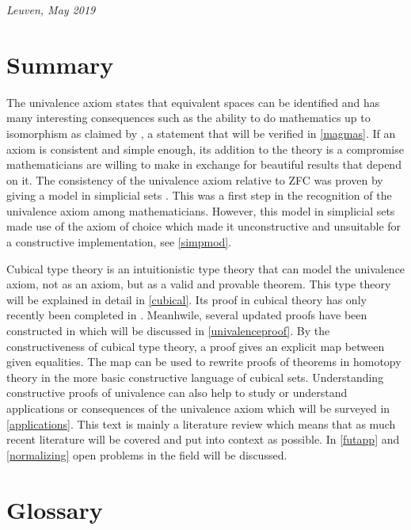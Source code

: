 \documentclass[12pt,a4paper,twoside,xetex]{book} %
\begin{document}
\mbox{}\hfill \textit{Leuven, May 2019}

\chapter*{Summary}


The univalence axiom states that equivalent spaces can be identified and has many interesting consequences such as the ability to do mathematics up to isomorphism as claimed by \cite{Voevodsky2013}, a statement that will be verified in \cref{magmas}. If an axiom is consistent and simple enough, its addition to the theory is a compromise mathematicians are willing to make in exchange for beautiful results that depend on it. The  consistency of the univalence axiom relative to ZFC was proven by giving a model in simplicial sets \cite{Kapulkin2012}. This was a first step in the recognition of the univalence axiom among mathematicians. However, this model in simplicial sets made use of the axiom of choice which made it unconstructive and unsuitable for a constructive implementation, see \cref{simpmod}.

Cubical type theory is an intuitionistic type theory that can model the univalence axiom, not as an axiom, but as a valid and provable theorem. This type theory will be explained in detail in \cref{cubical}. Its proof in cubical theory has only recently been completed in \cite{Cohen2016}. Meanhwile, several updated proofs have been constructed in \cite{Sterling2018b, Moertberg2018} which will be discussed in \cref{univalenceproof}. By the constructiveness of cubical type theory, a proof gives an explicit map between given equalities. The map can be used to rewrite proofs of theorems in homotopy theory in the more basic constructive language of cubical sets. Understanding constructive proofs of univalence can also help to study or understand applications or consequences of the univalence axiom which will be surveyed in \cref{applications}. This text is mainly a literature review which means that as much recent literature will be covered and put into context as possible. In \cref{futapp} and \cref{normalizing} open problems in the field will be discussed.

\chapter*{Glossary}
\end{document}

